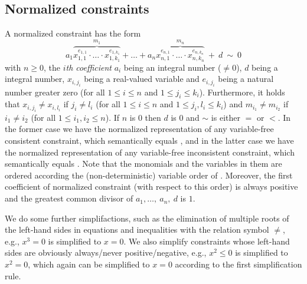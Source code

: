 \subsection{Normalized constraints}
A normalized constraint has the form
\[a_1\overbrace{x_{1,1}^{e_{1,1}}\cdot\ldots\cdot x_{1,k_1}^{e_{1,k_1}}}^{m_1}+\ldots+a_n\overbrace{x_{n,1}^{e_{n,1}}\cdot\ldots\cdot x_{n,k_n}^{e_{n,k_n}}}^{m_n}\ + \ d\ \sim \ 0\]
with $n\geq0$, the \emph{$i$th coefficient} $a_i$ being an integral number ($\neq 0$), $d$ being a integral number, $x_{i,j_i}$ being a real-valued variable and $e_{i,j_i}$ being a natural number greater zero (for all $1\leq i\leq n$ and $1\leq j_i\leq k_i$). Furthermore, it holds that
$x_{i,j_i}\neq x_{i,l_i}$ if $j_i\neq l_i$ (for all $1\leq i\leq n$ and $1\leq j_i, l_i\leq k_i$) and $m_{i_1}\neq m_{i_2}$ if $i_1\neq i_2$ (for all $1\leq i_1,i_2\leq n$). If $n$ is $0$ then $d$ is $0$ and $\sim$ is either $=$ or $<$. In the former case we have the normalized representation of any variable-free consistent constraint, which semantically equals \true, and in the latter case we have the normalized representation of any variable-free inconsistent constraint, which semantically equals \false. Note that the monomials and the variables in them are ordered according the (non-deterministic) variable order of \ginac.
Moreover, the first coefficient of normalized constraint (with respect to this order) is always positive and the greatest common divisor of $a_1,\ldots,\ a_n,\ d$ is $1$.

We do some further simplifactions, such as the elimination of multiple roots of the left-hand sides in equations and inequalities with the relation symbol $\neq$, e.g., $x^3=0$ is simplified to $x=0$. We also simplify constraints whose left-hand sides are obviously always/never positive/negative, e.g., $x^2\leq 0$ is simplified to $x^2=0$, which again can be simplified to $x=0$ according to the first simplification rule.

